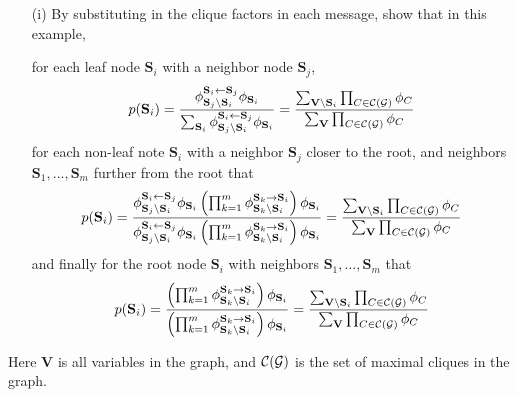 \documentclass[11pt]{article}
\renewcommand{\vec}[1]{\mathbf{#1}}
\begin{document}
\begin{itemize}
\item[(i)] By substituting in the clique factors in each message, show that in this example,

for each leaf node $\vec{S}_i$ with a neighbor node $\vec{S}_j$,
{\small
\begin{align*}
p(\vec{S}_i) =
\frac{
\phi^{\vec{S}_i \gets \vec{S}_j}_{\vec{S}_j \setminus \vec{S}_i} \phi_{\vec{S}_i}
}{
\sum_{\vec{S}_i}
\phi^{\vec{S}_i \gets \vec{S}_j}_{\vec{S}_j \setminus \vec{S}_i} \phi_{\vec{S}_i}
}
=
\frac{
\sum_{\vec{V} \setminus \vec{S}_i} \prod_{C \in {\cal C}({\cal G})} \phi_C
}{
\sum_{\vec{V}} \prod_{C \in {\cal C}({\cal G})} \phi_C
}
\end{align*}
}
for each non-leaf note $\vec{S}_i$ with a neighbor $\vec{S}_j$ closer to the root, and neighbors $\vec{S}_1, \ldots, \vec{S}_m$ further from the root that
{\small
\begin{align*}
p(\vec{S}_i) =
\frac{
\phi^{\vec{S}_i \gets \vec{S}_j}_{\vec{S}_j \setminus \vec{S}_i} \phi_{\vec{S}_i}
\left( \prod_{k=1}^m \phi^{\vec{S}_k \to \vec{S}_i}_{\vec{S}_k \setminus \vec{S}_i} \right) \phi_{\vec{S}_i}
}{
\phi^{\vec{S}_i \gets \vec{S}_j}_{\vec{S}_j \setminus \vec{S}_i} \phi_{\vec{S}_i}
\left( \prod_{k=1}^m \phi^{\vec{S}_k \to \vec{S}_i}_{\vec{S}_k \setminus \vec{S}_i} \right) \phi_{\vec{S}_i}
}
=
\frac{
\sum_{\vec{V} \setminus \vec{S}_i} \prod_{C \in {\cal C}({\cal G})} \phi_C
}{
\sum_{\vec{V}} \prod_{C \in {\cal C}({\cal G})} \phi_C
}
\end{align*}
}
and finally for the root node $\vec{S}_i$ with neighbors $\vec{S}_1, \ldots, \vec{S}_m$ that
{\small
\begin{align*}
p(\vec{S}_i) =
\frac{
\left( \prod_{k=1}^m \phi^{\vec{S}_k \to \vec{S}_i}_{\vec{S}_k \setminus \vec{S}_i} \right) \phi_{\vec{S}_i}
}{
\left( \prod_{k=1}^m \phi^{\vec{S}_k \to \vec{S}_i}_{\vec{S}_k \setminus \vec{S}_i} \right) \phi_{\vec{S}_i}
}
=
\frac{
\sum_{\vec{V} \setminus \vec{S}_i} \prod_{C \in {\cal C}({\cal G})} \phi_C
}{
\sum_{\vec{V}} \prod_{C \in {\cal C}({\cal G})} \phi_C
}
\end{align*}
}
\end{itemize}

Here $\vec{V}$ is all variables in the graph, and ${\cal C}({\cal G})$ is the set of maximal cliques in the graph.

\begin{answertext}{15cm}{}

\end{answertext}
\end{document}
